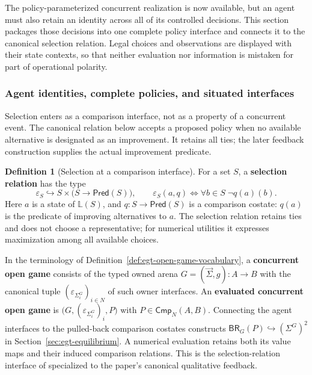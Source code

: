 \documentclass[11pt,a4paper]{article}
\numberwithin{equation}{section}
\theoremstyle{definition}
\newtheorem{definition}[theorem]{Definition}
\theoremstyle{remark}
\theoremstyle{plain}
\begin{document}
The policy-parameterized concurrent realization is now available, but
an agent must also retain an identity across all of its controlled
decisions. This section packages those decisions into one complete policy
interface and connects it to the canonical selection relation. Legal
choices and observations are displayed with their state contexts, so that
neither evaluation nor information is mistaken for part of operational
polarity.

\subsubsection{Agent identities, complete policies, and situated interfaces}

Selection enters as a comparison interface, not as a property of a
concurrent event. The canonical relation below accepts a proposed policy
when no available alternative is designated as an improvement. It retains
all ties; the later feedback construction supplies the actual
improvement predicate.

\begin{definition}[Selection at a comparison interface]
\label{def:cgt-selection}
For a set $S$, a \textbf{selection relation} has the type
\[
 \varepsilon_S\hookrightarrow
 S\times\bigl(S\to\mathsf{Pred}(S)\bigr),\qquad
 \varepsilon_S(a,q)\iff\forall b\in S\;\neg q(a)(b).
\]
Here $a$ is a state of $\mathbb L(S)$, and
$q:S\to\mathsf{Pred}(S)$ is a comparison costate: $q(a)$ is the
predicate of improving alternatives to $a$. The selection relation
retains ties and does not choose a representative; for numerical
utilities it expresses maximization among all available choices.

In the terminology of Definition~\ref{def:egt-open-game-vocabulary},
a \textbf{concurrent open game} consists of the typed owned arena
$G=(\vec\Sigma,g):A\to B$ with the canonical tuple
$(\varepsilon_{\Sigma_i^G})_{i\in N}$ of such owner interfaces.
An \textbf{evaluated concurrent open game} is
$\bigl(G,(\varepsilon_{\Sigma_i^G})_i,P\bigr)$ with
$P\in\mathsf{Cmp}_N(A,B)$. Connecting the agent interfaces to the
pulled-back comparison costates constructs
$\mathsf{BR}_G(P)\hookrightarrow(\Sigma^G)^2$ in
Section~\ref{sec:egt-equilibrium}.
A numerical evaluation retains both its value maps and their induced comparison relations. This is the selection-relation interface
of \citet{CapucciEtAl2022Cybernetics} specialized to the paper's
canonical qualitative feedback.
\end{definition}
\end{document}
